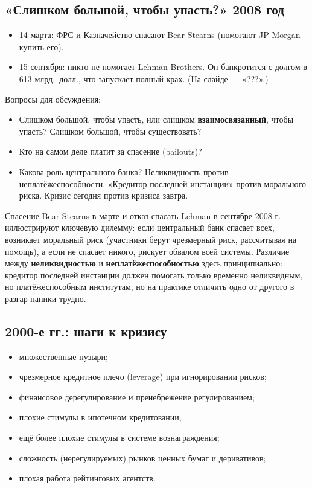 \documentclass[10pt,a4paper]{article}
\begin{document}
\subsection{«Слишком большой, чтобы упасть?» 2008 год}

\begin{itemize}[leftmargin=1.3em]
\item 14 марта: ФРС и Казначейство спасают Bear Stearns (помогают JP Morgan купить его).
\item 15 сентября: никто не помогает Lehman Brothers. Он банкротится с долгом в 613 млрд.\ долл., что запускает полный крах. (На слайде — «???».)
\end{itemize}

Вопросы для обсуждения:
\begin{itemize}[leftmargin=1.3em]
\item Слишком большой, чтобы упасть, или слишком \textbf{взаимосвязанный}, чтобы упасть? Слишком большой, чтобы существовать?
\item Кто на самом деле платит за спасение (bailouts)?
\item Какова роль центрального банка? Неликвидность против неплатёжеспособности. «Кредитор последней инстанции» против морального риска. Кризис сегодня против кризиса завтра.
\end{itemize}

\begin{intuition}
Спасение Bear Stearns в марте и отказ спасать Lehman в сентябре 2008 г. иллюстрируют ключевую дилемму: если центральный банк спасает всех, возникает моральный риск (участники берут чрезмерный риск, рассчитывая на помощь), а если не спасает никого, рискует обвалом всей системы. Различие между \textbf{неликвидностью} и \textbf{неплатёжеспособностью} здесь принципиально: кредитор последней инстанции должен помогать только временно неликвидным, но платёжеспособным институтам, но на практике отличить одно от другого в разгар паники трудно.
\end{intuition}

\subsection{2000-е гг.: шаги к кризису}

\begin{itemize}[leftmargin=1.3em]
\item множественные пузыри;
\item чрезмерное кредитное плечо (leverage) при игнорировании рисков;
\item финансовое дерегулирование и пренебрежение регулированием;
\item плохие стимулы в ипотечном кредитовании;
\item ещё более плохие стимулы в системе вознаграждения;
\item сложность (нерегулируемых) рынков ценных бумаг и деривативов;
\item плохая работа рейтинговых агентств.
\end{itemize}
\end{document}
